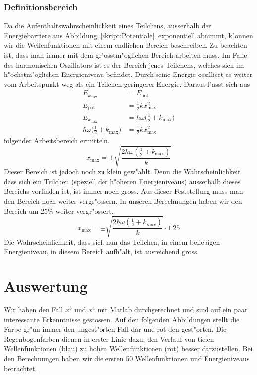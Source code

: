\begin{refsection}
\subsubsection{Definitionsbereich}
Da die  Aufenthaltswahrscheinlichkeit eines Teilchens,
ausserhalb der Energiebarriere aus Abbildung~\ref{skript:Potentiale},
exponentiell abnimmt,
k"onnen wir die Wellenfunktionen mit einem endlichen Bereich beschreiben.
Zu beachten ist,
dass man immer mit dem gr"osstm"oglichen Bereich arbeiten muss.
Im Falle des harmonischen Oszillators ist es der Bereich jenes Teilchens,
welches sich im h"ochstm"oglichen Energieniveau befindet.
Durch seine Energie oszilliert es weiter vom Arbeitspunkt weg
als ein Teilchen geringerer Energie.
Daraus l"asst sich aus
\begin{align*} 
E_{k_{\text{max}}}
&=
E_{\text{pot}}
\\
E_{\text{pot}}
&=
\frac12 kx_{\text{max}}^2
\\
E_{k_{\text{max}}}
&=
\hbar\omega\biggl(\frac12+k_{\text{max}}\biggr)
\\
\hbar\omega\biggl(\frac12+k_{\text{max}}\biggr)
&=
\frac12 kx_{\text{max}}^2
\end{align*}
folgender Arbeitsbereich ermitteln.
\[
x_{\text{max}}
=
\pm\sqrt{\frac{2\hbar\omega(\frac12+k_{\text{max}})}k}
\]
Dieser Bereich ist jedoch noch zu klein gew"ahlt.
Denn die Wahrscheinlichkeit dass sich ein Teilchen
(speziell der h"oheren Energieniveaus) ausserhalb dieses Bereichs vorfinden ist,
ist immer noch gross.
Aus dieser Feststellung muss man den Bereich noch weiter vergr"ossern.
In unseren Berechnungen haben wir den Bereich um 25\% weiter vergr"ossert.
\[
x_{\text{max}}
=
\pm\sqrt{\frac{2\hbar\omega(\frac12+k_{max})}k}\cdot 1.25
\]
Die Wahrscheinlichkeit,
dass sich nun das Teilchen, in einem beliebigen Energieniveau, in diesem Bereich aufh"alt,
ist ausreichend gross.


\section{Auswertung}

Wir haben den Fall $x^3$ und $x^4$ mit Matlab durchgerechnet und sind auf
ein paar interessante Erkenntnisse gestossen.
Auf den folgenden Abbildungen stellt die Farbe gr"un
immer den ungest"orten Fall dar und rot den gest"orten.
Die Regenbogenfarben dienen in erster Linie dazu, den Verlauf von
tiefen Wellenfunktionen (blau) zu hohen Wellenfunktionen (rot) besser darzustellen.
Bei den Berechnungen haben wir die ersten 50 Wellenfunktionen und Energieniveaus
betrachtet.


\end{refsection}
